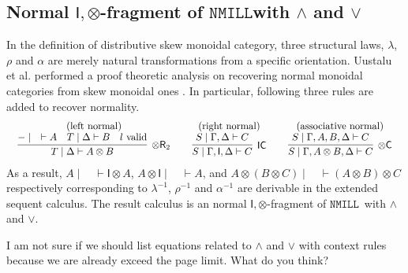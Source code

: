 \documentclass[submission,copyright,creativecommons]{eptcs}
\theoremstyle{definition}
\newcommand{\tr}{\otimes \mathsf{R}}
\newcommand{\tc}{\otimes \mathsf{C}}
\newcommand{\unitc}{\mathsf{IC}}
\newcommand{\ot}{\otimes}
\newcommand{\I}{\mathsf{I}}
\newcommand{\proofbox}[1]{\begin{tabular}{l} #1 \end{tabular}}
\newcommand{\NMILL}{$\mathtt{NMILL}$}
\newcommand\cheng[1]{\mbox{}
{\marginpar{\color{blue}CSW}}
{\sf\noindent\color{blue}#1}}%
\begin{document}
\subsection{Normal $\I , \ot$-fragment of \NMILL with $\land$ and $\lor$}\label{subsec:asso:uni}
In the definition of distributive skew monoidal category, three structural laws, $\lambda$, $\rho$ and $\alpha$ are merely natural transformations from a specific orientation.
Uustalu et al. performed a proof theoretic analysis on  recovering normal monoidal categories from skew monoidal ones \cite{uustalu:proof:nodate}.
In particular, following three rules are added to recover normality.
\begin{equation}\label{eq:normality:rules}
  \begin{array}{ccc}
    (\text{left normal}) & (\text{right normal}) & (\text{associative normal})
    \\
    \proofbox{
    \infer[\tr_{2}]{T \mid \Delta \vdash A \ot B}{
      - \mid \quad \vdash A
      &
      T \mid \Delta \vdash B
      &
      l \ \text{valid}
    }
    }
    &
    \proofbox{
    \infer[\unitc]{S \mid \Gamma , \I , \Delta \vdash C}{S \mid \Gamma , \Delta \vdash C}
    }
    &
    \proofbox{
    \infer[\tc]{S \mid \Gamma , A \ot B , \Delta \vdash C}{S \mid \Gamma , A , B , \Delta \vdash C}
    }
  \end{array}
\end{equation}
As a result, $A \mid \quad \vdash \I \ot A$, $A \ot \I \mid \quad \vdash A$, and $A \ot (B \ot C) \mid \quad \vdash (A \ot B) \ot C$ respectively corresponding to    $\lambda^{-1}$, $\rho^{-1}$ and $\alpha^{-1}$ are derivable in the extended sequent calculus.
The result calculus is an normal $\I , \ot$-fragment of \NMILL \ with $\land$ and $\lor$.

\cheng{I am not sure if we should list equations related to $\land$ and $\lor$ with context rules because we are already exceed the page limit. What do you think?}
\end{document}
